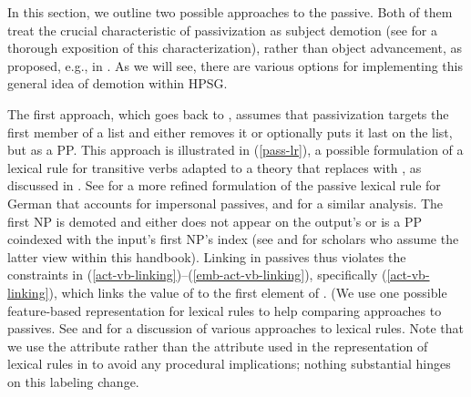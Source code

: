 \documentclass[output=paper
                ,modfonts
                ,nonflat
	        ,collection
	        ,collectionchapter
	        ,collectiontoclongg
 	        ,biblatex
                ,babelshorthands
                ,newtxmath
                ,draftmode
                ,colorlinks, citecolor=brown
]{./langsci/langscibook}
\begin{document}
In this section, we outline two possible approaches to 
the passive.  
Both of them treat the crucial characteristic of passivization as subject demotion (see \citealt{Blevins2003} for a thorough exposition of this characterization), rather than object advancement, as proposed, e.g., in  \citep{PerlmutterandPostal1983b}.
As we will see, there are various options for implementing this general idea of demotion within HPSG.

The first approach, which goes back to \citet{pollard+sag:1987}, assumes that passivization targets the first member of a  list and either removes it or optionally puts it last on the list, but as a PP.
This approach is illustrated in (\ref{pass-lr}), a possible formulation of a lexical rule for transitive verbs adapted to a theory that replaces  with \argst, as discussed in \citet[67]{Manning+Sag:1999}. 
See \citealt{Mueller2000h} for a  more refined formulation of the passive lexical rule for German that accounts for impersonal passives, and \citet{Blevins2003} for a similar analysis.
The first NP is demoted and either does not appear on the output's \argst or is a PP coindexed with the input's first NP's index (see  and  for scholars who assume the latter view within this handbook).
Linking in passives thus violates the constraints in (\ref{act-vb-linking})--(\ref{emb-act-vb-linking}), specifically (\ref{act-vb-linking}), which links the value of  to the first element of \argst. (We use one possible feature-based representation for lexical rules to help comparing approaches to passives. See \citet{Meurers2001} and  for a discussion of various approaches to lexical rules.
Note that we use the attribute  rather than the  attribute used in the representation of lexical rules in \citet[76]{Meurers2001} to avoid any procedural implications; nothing substantial hinges on this labeling change.
\end{document}
